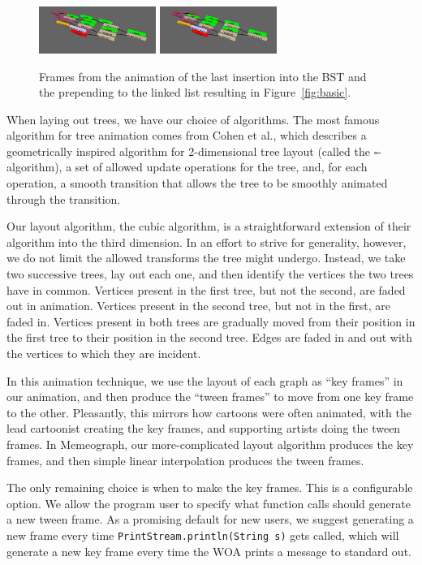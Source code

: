 \documentclass[11pt]{article}
\begin{document}
\begin{figure}
\begin{center}
\includegraphics[width=1.5in]{figures/bar-032.png}
\includegraphics[width=1.5in]{figures/bar-034.png}
\end{center}
\caption{Frames from the animation of the last insertion into the BST and the prepending to the linked list resulting in Figure~\ref{fig:basic}.}
\end{figure}

When laying out trees, we have our choice of algorithms.  The most famous
algorithm for tree animation comes from Cohen et al.\cite{tamassia}, which
describes a geometrically inspired algorithm for 2-dimensional tree layout
(called the $\square$-algorithm), a set of allowed update operations for the
tree, and, for each operation, a smooth transition that allows the tree to be
smoothly animated through the transition.

Our layout algorithm, the cubic algorithm, is a straightforward extension of
their algorithm into the third dimension.  In an effort to strive for
generality, however, we do not limit the allowed transforms the tree might
undergo.  Instead, we take two successive trees, lay out each one, and then
identify the vertices the two trees have in common.  Vertices present in the
first tree, but not the second, are faded out in animation.  Vertices present
in the second tree, but not in the first, are faded in.  Vertices present in
both trees are gradually moved from their position in the first tree to their
position in the second tree.  Edges are faded in and out with the vertices to
which they are incident.

In this animation technique, we use the layout of each graph as ``key frames''
in our animation, and then produce the ``tween frames'' to move from one key
frame to the other.  Pleasantly, this mirrors how cartoons were often animated,
with the lead cartoonist creating the key frames, and supporting artists doing
the tween frames.  In Memeograph, our more-complicated layout algorithm
produces the key frames, and then simple linear interpolation produces the
tween frames.

The only remaining choice is when to make the key frames.  This is a
configurable option.  We allow the program user to specify what function calls
should generate a new tween frame.  As a promising default for new users, we
suggest generating a new frame every time {\tt PrintStream.println(String s)}
gets called, which will generate a new key frame every time the WOA prints a
message to standard out.
\end{document}
